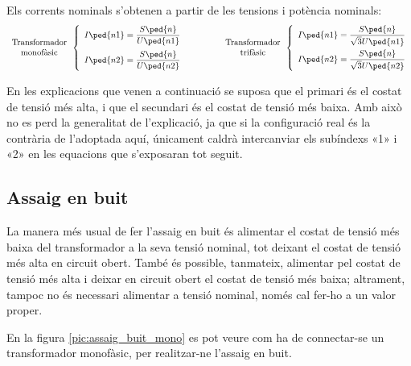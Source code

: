 Els corrents nominals s'obtenen a partir de les tensions i potència
nominals:
\begin{equation}
\begin{array}{c}\text{Transformador}\\
\text{monofàsic}
\end{array} \left\{
\begin{array}{l}
   I\ped{n1} = \dfrac{S\ped{n}}{U\ped{n1}} \\[2.7ex]
   I\ped{n2} = \dfrac{S\ped{n}}{U\ped{n2}}
\end{array}
\right. \qquad\qquad
\begin{array}{c}\text{Transformador}\\
\text{trifàsic}
\end{array} \left\{
\begin{array}{l}
   I\ped{n1} = \dfrac{S\ped{n}}{\sqrt{3}U\ped{n1}} \\[2.5ex]
   I\ped{n2} = \dfrac{S\ped{n}}{\sqrt{3}U\ped{n2}}
\end{array}
\right.
\end{equation}

En les explicacions que venen a continuació se suposa que el
primari és el costat de tensió més alta, i que el secundari és el costat de tensió més baixa. Amb això no es perd la generalitat de
l'explicació, ja que si la configuració real és la contrària de l'adoptada aquí, únicament caldrà intercanviar els subíndexs «1» i «2» en
les equacions que s'exposaran tot seguit.

\subsection{Assaig en buit}

La manera més usual de fer l'assaig en buit és alimentar el costat
de  tensió més baixa del transformador a  la seva tensió nominal, tot
deixant el costat de tensió més alta en circuit obert. També és possible,
tanmateix, alimentar pel costat de tensió més alta i deixar en circuit
obert el costat de  tensió més baixa; altrament, tampoc no és necessari
alimentar a tensió nominal, només cal fer-ho a un valor proper.

En la figura \vref{pic:assaig_buit_mono} es pot veure com ha de
connectar-se un transformador monofàsic, per  realitzar-ne
l'assaig en buit.

\begin{center}
    
    \label{pic:assaig_buit_mono}
\end{center}

